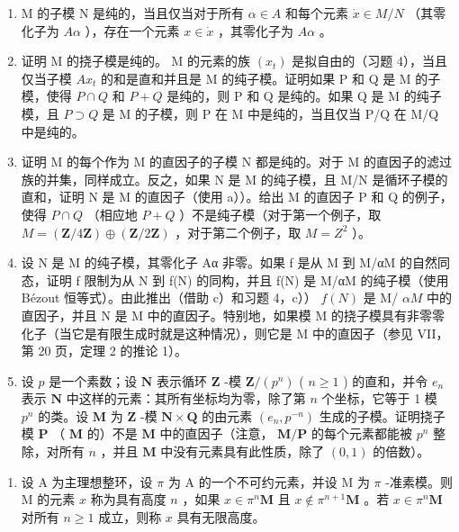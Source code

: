 \begin{enumerate}
\def\labelenumi{\alph{enumi})}
\item
  M 的子模 N 是纯的，当且仅当对于所有 \(\alpha \in A\) 和每个元素 \(\dot{x} \in M/N\) （其零化子为 \(A\alpha\) ），存在一个元素 \(x \in \dot{x}\) ，其零化子为 \(A\alpha\) 。
\item
  证明 M 的挠子模是纯的。 M 的元素的族 \((x_{t})\) 是拟自由的（习题 4），当且仅当子模 \(Ax_{t}\) 的和是直和并且是 M 的纯子模。证明如果 P 和 Q 是 M 的子模，使得 \(P \cap Q\) 和 \(P + Q\) 是纯的，则 P 和 Q 是纯的。如果 Q 是 M 的纯子模，且 \(P \supset Q\) 是 M 的子模，则 P 在 M 中是纯的，当且仅当 P/Q 在 M/Q 中是纯的。
\item
  证明 M 的每个作为 M 的直因子的子模 N 都是纯的。对于 M 的直因子的滤过族的并集，同样成立。反之，如果 N 是 M 的纯子模，且 M/N 是循环子模的直和，证明 N 是 M 的直因子（使用 a））。给出 M 的直因子 P 和 Q 的例子，使得 \(P \cap Q\) （相应地 \(P + Q\) ）不是纯子模（对于第一个例子，取 \(M = (\mathbf{Z}/4\mathbf{Z}) \oplus (\mathbf{Z}/2\mathbf{Z})\) ，对于第二个例子，取 \(M = Z^{2}\) ）。
\item
  设 N 是 M 的纯子模，其零化子 Aα 非零。如果 f 是从 M 到 M/αM 的自然同态，证明 f 限制为从 N 到 f(N) 的同构，并且 f(N) 是 M/αM 的纯子模（使用 Bézout 恒等式）。由此推出（借助 c）和习题 4，c）） \(f(N)\) 是 M/ \(\alpha M\) 中的直因子，并且 N 是 M 中的直因子。特别地，如果模 M 的挠子模具有非零零化子（当它是有限生成时就是这种情况），则它是 M 中的直因子（参见 VII，第 20 页，定理 2 的推论 1）。
\item
  设 \(p\) 是一个素数；设 \(\mathbf{N}\) 表示循环 \(\mathbf{Z}\) -模 \(\mathbf{Z} / (p^n)\) ( \(n \geqslant 1\) ) 的直和，并令 \(e_n\) 表示 \(\mathbf{N}\) 中这样的元素：其所有坐标均为零，除了第 \(n\) 个坐标，它等于 1 模 \(p^n\) 的类。设 \(\mathbf{M}\) 为 \(\mathbf{Z}\) -模 \(\mathbf{N} \times \mathbf{Q}\) 的由元素 \((e_n, p^{-n})\) 生成的子模。证明挠子模 \(\mathbf{P}\) （ \(\mathbf{M}\) 的）不是 \(\mathbf{M}\) 中的直因子（注意， \(\mathbf{M} / \mathbf{P}\) 的每个元素都能被 \(p^n\) 整除，对所有 \(n\) ，并且 \(\mathbf{M}\) 中没有元素具有此性质，除了 \((0, 1)\) 的倍数）。
\end{enumerate}

\begin{enumerate}
\def\labelenumi{\arabic{enumi})}
\setcounter{enumi}{7}
\tightlist
\item
  设 A 为主理想整环，设 \(\pi\) 为 A 的一个不可约元素，并设 M 为 \(\pi\) -准素模。则 M 的元素 \(x\) 称为具有高度 \(n\) ，如果 \(x \in \pi^n\mathbf{M}\) 且 \(x \notin \pi^{n+1}\mathbf{M}\) 。若 \(x \in \pi^n\mathbf{M}\) 对所有 \(n \geqslant 1\) 成立，则称 \(x\) 具有无限高度。
\end{enumerate}

